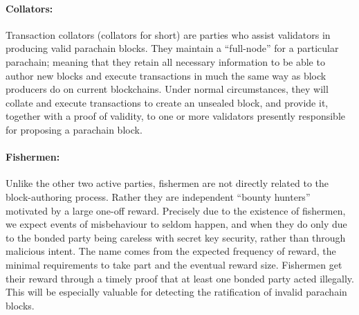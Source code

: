 \documentclass{article}
\begin{document}
\paragraph{Collators: }\label{par:collators} Transaction collators (collators for short) are parties who assist validators in producing valid parachain blocks. They maintain a “full-node” for a particular parachain; meaning that they retain all necessary information to be able to author new blocks and execute transactions in much the same way as block producers do on current blockchains. Under normal circumstances, they will collate and execute transactions to create an unsealed block, and provide it, together with a proof of validity, to one or more validators presently responsible for proposing a parachain block.


\paragraph{Fishermen:} \label{par:fishermen} Unlike the other two active parties, fishermen are not directly related to the block-authoring process. Rather they are independent “bounty hunters” motivated by a large one-off reward. Precisely due to the existence of fishermen, we expect events of misbehaviour to seldom happen, and when they do only due to the bonded party being careless with secret key security, rather than through malicious intent. The name comes from the expected frequency of reward, the minimal requirements to take part and the eventual reward size.
Fishermen get their reward through a timely proof that at least one bonded party acted illegally. This will be especially valuable for detecting the ratification of invalid parachain blocks.
\end{document}
